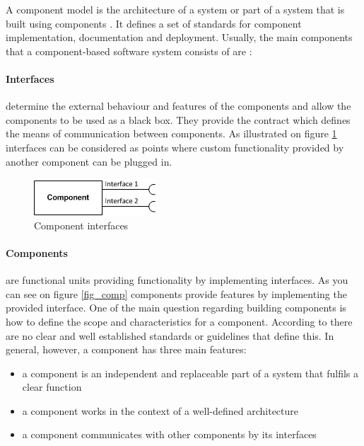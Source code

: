 A component model is the architecture of a system or part of a system that is built using components \cite{Cai}. It defines a set of  standards for component implementation, documentation and deployment. Usually, the main components that a component-based software system consists of are \cite{Chen}:

\paragraph{Interfaces}
	determine the external behaviour and features of the components and allow the components to be used as a black box. They provide the contract which defines the means of communication between components. As illustrated on figure \ref{fig_intf} interfaces can be considered as points where custom functionality provided by another component can be plugged in. 
	
	\begin{figure}[h!]
  		\centering
  		\includegraphics[scale=0.75]{plug-in/component-interfaces.png}
  		\caption{Component interfaces }
  		\label{fig_intf}
	\end{figure}

\paragraph{Components}
	are functional units providing functionality by implementing interfaces. As you can see on figure \ref{fig_comp} components provide  features by implementing the provided interface. One of the main question regarding building components is how to define the scope and characteristics for a component. According to \cite{Cai} there are no clear and well established standards or guidelines that define this. In general, however, a component has three main features: 

\begin{itemize}
	\item a component is an independent and replaceable part of a system that fulfils a clear function
	\item a component works in the context of a well-defined architecture
	\item a component communicates with other components by its interfaces 
\end{itemize}

